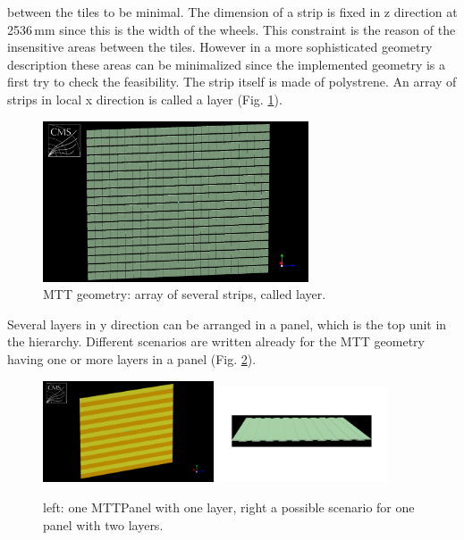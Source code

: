 			between the tiles to be minimal.
			The dimension of a strip is fixed in z direction at 2536\,mm since this is the width of the wheels.
			This constraint is the reason of the insensitive areas between the tiles.
			However in a more sophisticated geometry description these areas can be minimalized since the implemented geometry is a first try to check the feasibility. 
			The strip itself is made of polystrene.
			An array of strips in local x direction is called a layer (Fig. \ref{fig:layer}).
			\begin{figure}[htbp]
				\centering
				\includegraphics[width=0.70\textwidth]{Figures/erdogan/layer.png}
				\caption{MTT geometry: array of several strips, called layer.}
				\label{fig:layer}
			\end{figure}
			Several layers in y direction can be arranged in a panel, which is the top unit in the hierarchy.
			Different scenarios are written already for the MTT geometry having one or more layers in a panel (Fig. \ref{fig:panel}).
			\begin{figure}[htbp]
				\centering
				\includegraphics[width=0.45\textwidth]{Figures/erdogan/panel1.png}
				\includegraphics[width=0.45\textwidth]{Figures/erdogan/panel2.png}
				\caption{left: one MTTPanel with one layer, right a possible scenario for one panel with two layers.}
				\label{fig:panel}
			\end{figure}
